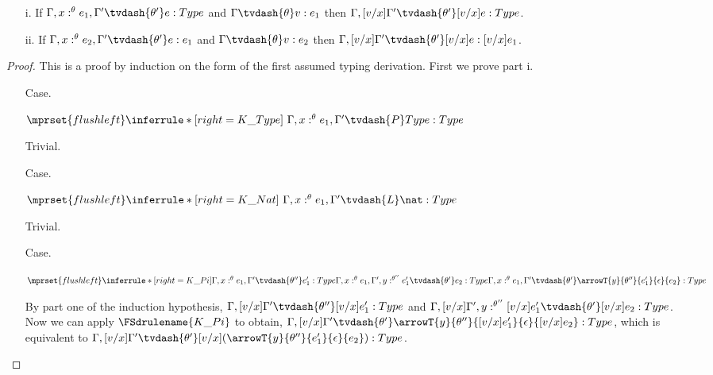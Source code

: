 \begin{lemma}[Substitution]
  \label{lemma:substitution}
  \begin{itemize}
  \item[]
  \item[i.] If $\Gamma,x:^\theta e_1,\Gamma' \tvdash{\theta'} e:Type$ and 
    $\Gamma \tvdash{\theta} v:e_1$ 
    then $\Gamma,[v/x]\Gamma' \tvdash{\theta'} [v/x]e:Type$.
  \item[ii.] If $\Gamma,x:^\theta e_2,\Gamma' \tvdash{\theta'} e:e_1$ and 
    $\Gamma \tvdash{\theta} v:e_2$ 
    then $\Gamma,[v/x]\Gamma' \tvdash{\theta'} [v/x]e:[v/x]e_1$.
  \end{itemize}
\end{lemma}
\begin{proof}
  This is a proof by induction on the form of the first assumed typing derivation.
  First we prove part i.
  \begin{itemize}
  \item[Case.] \ \\
    \begin{center}
      \begin{math}
        $$\mprset{flushleft}
        \inferrule* [right=K\_Type] {
          \ 
        }{\Gamma,x:^\theta e_1,\Gamma' \tvdash{P} Type:Type}
      \end{math}
    \end{center}
    Trivial.

  \item[Case.]\ \\
    \begin{center}
      \begin{math}
        $$\mprset{flushleft}
        \inferrule* [right=K\_Nat] {
          \ 
        }{\Gamma,x:^\theta e_1,\Gamma' \tvdash{L} \nat:Type}
      \end{math}
    \end{center}
    Trivial.

  \item[Case.]\ \\
    \begin{center}
      \begin{math}
        $$\mprset{flushleft}
        \inferrule* [right=K\_Pi] {
          \Gamma,x:^\theta e_1,\Gamma' \tvdash{\theta''} e'_1:Type
          \\\\
          \Gamma,x:^\theta e_1,\Gamma',y:^{\theta''} e'_1 \tvdash{\theta'} e_2:Type
   }{\Gamma,x:^\theta e_1,\Gamma' \tvdash{\theta'} \arrowT{y}{\theta''}{e'_1}{\epsilon}{e_2}:Type}
      \end{math}
    \end{center}
    By part one of the induction hypothesis, 
    $\Gamma,[v/x]\Gamma' \tvdash{\theta''} [v/x]e'_1:Type$ and
    $\Gamma,[v/x]\Gamma',y:^{\theta''} [v/x]e'_1 \tvdash{\theta'} [v/x]e_2:Type$.  Now we can
    apply $\FSdrulename{K\_Pi}$ to obtain, 
 $\Gamma,[v/x]\Gamma' \tvdash{\theta'} \arrowT{y}{\theta''}{[v/x]e'_1}{\epsilon}{[v/x]e_2}:Type$,
    which is equivalent to
  $\Gamma,[v/x]\Gamma' \tvdash{\theta'} [v/x](\arrowT{y}{\theta''}{e'_1}{\epsilon}{e_2}):Type$.
    

\end{itemize}
\end{proof}
